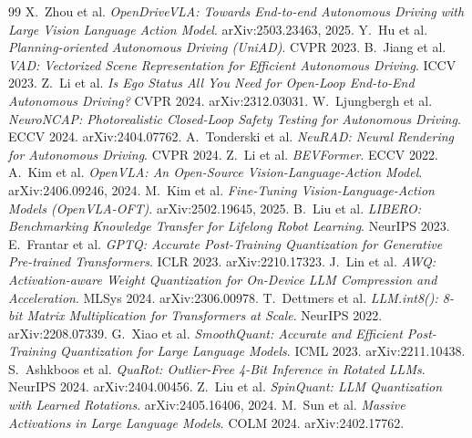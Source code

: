 \documentclass[conference]{IEEEtran}
\begin{document}
\begin{thebibliography}{99}
 X.\ Zhou et al. \emph{OpenDriveVLA: Towards End-to-end Autonomous Driving with
Large Vision Language Action Model}. arXiv:2503.23463, 2025.
 Y.\ Hu et al. \emph{Planning-oriented Autonomous Driving (UniAD)}. CVPR 2023.
 B.\ Jiang et al. \emph{VAD: Vectorized Scene Representation for Efficient Autonomous
Driving}. ICCV 2023.
 Z.\ Li et al. \emph{Is Ego Status All You Need for Open-Loop End-to-End
Autonomous Driving?} CVPR 2024. arXiv:2312.03031.
 W.\ Ljungbergh et al. \emph{NeuroNCAP: Photorealistic Closed-Loop Safety Testing
for Autonomous Driving}. ECCV 2024. arXiv:2404.07762.
 A.\ Tonderski et al. \emph{NeuRAD: Neural Rendering for Autonomous Driving}. CVPR 2024.
 Z.\ Li et al. \emph{BEVFormer}. ECCV 2022.
 A.\ Kim et al. \emph{OpenVLA: An Open-Source Vision-Language-Action Model}.
arXiv:2406.09246, 2024.
 M.\ Kim et al. \emph{Fine-Tuning Vision-Language-Action Models (OpenVLA-OFT)}.
arXiv:2502.19645, 2025.
 B.\ Liu et al. \emph{LIBERO: Benchmarking Knowledge Transfer for Lifelong Robot
Learning}. NeurIPS 2023.
 E.\ Frantar et al. \emph{GPTQ: Accurate Post-Training Quantization for Generative
Pre-trained Transformers}. ICLR 2023. arXiv:2210.17323.
 J.\ Lin et al. \emph{AWQ: Activation-aware Weight Quantization for On-Device LLM
Compression and Acceleration}. MLSys 2024. arXiv:2306.00978.
 T.\ Dettmers et al. \emph{LLM.int8(): 8-bit Matrix Multiplication for Transformers
at Scale}. NeurIPS 2022. arXiv:2208.07339.
 G.\ Xiao et al. \emph{SmoothQuant: Accurate and Efficient Post-Training
Quantization for Large Language Models}. ICML 2023. arXiv:2211.10438.
 S.\ Ashkboos et al. \emph{QuaRot: Outlier-Free 4-Bit Inference in Rotated LLMs}.
NeurIPS 2024. arXiv:2404.00456.
 Z.\ Liu et al. \emph{SpinQuant: LLM Quantization with Learned Rotations}.
arXiv:2405.16406, 2024.
 M.\ Sun et al. \emph{Massive Activations in Large Language Models}. COLM 2024.
arXiv:2402.17762.
\end{thebibliography}
\end{document}
